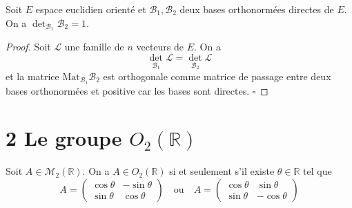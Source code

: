 \begin{proposition}
\label{prop:20}

Soit $E$ espace euclidien orienté et $\mathcal{B}_1, \mathcal{B}_2$ deux bases orthonormées directes de $E$. On a $\det_{\mathcal{B}_1} \mathcal{B}_2 = 1$.

\end{proposition}

\begin{proof}

Soit $\mathcal{L}$ une famille de $n$ vecteurs de $E$. On a
\[
\det_{\mathcal{B}_1} \mathcal{L} = \det_{\mathcal{B}_2} \mathcal{L}
\]
et la matrice $\mathrm{Mat}_{\mathcal{B}_1} \mathcal{B}_2$ est orthogonale comme matrice de passage entre deux bases orthonormées et positive car les bases sont directes.
\hfill $\square$

\end{proof}

\section{2 Le groupe $O_2(\mathbb{R})$}

\begin{theorem}
\label{thm:6}

Soit $A \in \mathcal{M}_2(\mathbb{R})$. On a $A \in O_2(\mathbb{R})$ si et seulement s'il existe $\theta \in \mathbb{R}$ tel que
\[
A = \begin{pmatrix}
\cos \theta & -\sin \theta \\
\sin \theta & \cos \theta
\end{pmatrix}
\quad \text{ou} \quad
A = \begin{pmatrix}
\cos \theta & \sin \theta \\
\sin \theta & -\cos \theta
\end{pmatrix}
\]

\end{theorem}


